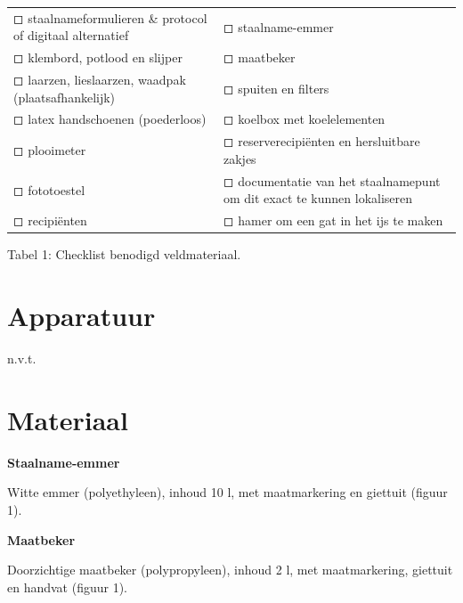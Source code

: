 \documentclass[
]{scrreprt}
\begin{document}
\begin{longtable}[]{@{}
  >{\raggedright\arraybackslash}p{}
  >{\raggedright\arraybackslash}p{}@{}}
\toprule\noalign{}
\endhead
\bottomrule\noalign{}
\endlastfoot
◻ staalnameformulieren \& protocol of digitaal alternatief & ◻ staalname-emmer \\
◻ klembord, potlood en slijper & ◻ maatbeker \\
◻ laarzen, lieslaarzen, waadpak (plaatsafhankelijk) & ◻ spuiten en filters \\
◻ latex handschoenen (poederloos) & ◻ koelbox met koelelementen \\
◻ plooimeter & ◻ reserverecipiënten en hersluitbare zakjes \\
◻ fototoestel & ◻ documentatie van het staalnamepunt om dit exact te kunnen lokaliseren \\
◻ recipiënten & ◻ hamer om een gat in het ijs te maken \\
\end{longtable}

Tabel 1: Checklist benodigd veldmateriaal.

\section{Apparatuur}\label{apparatuur}

n.v.t.

\section{Materiaal}\label{materiaal}

\textbf{Staalname-emmer}

Witte emmer (polyethyleen), inhoud 10 l, met maatmarkering en giettuit (figuur 1).

\textbf{Maatbeker}

Doorzichtige maatbeker (polypropyleen), inhoud 2 l, met maatmarkering, giettuit en handvat (figuur 1).
\end{document}
